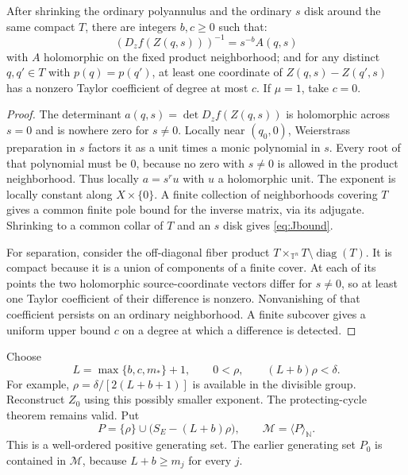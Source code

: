\documentclass[11pt,letterpaper]{article}
\theoremstyle{definition}
\theoremstyle{remark}
\newcommand{\N}{\mathbb N}\newcommand{\Z}{\mathbb Z}\newcommand{\Q}{\mathbb Q}
\newcommand{\T}{\mathbb T}\newcommand{\D}{\mathbb D}
\newcommand{\powers}[1]{\langle #1\rangle_{\N}}
\numberwithin{equation}{section}
\begin{document}
\begin{lemma}\label{lem:bounds}
After shrinking the ordinary polyannulus and the ordinary $s$ disk around the
same compact $T$, there are integers $b,c\geq0$ such that:
\begin{equation}\label{eq:Jbound}
 (D_zf(Z(q,s)))^{-1}=s^{-b}A(q,s)
\end{equation}
with $A$ holomorphic on the fixed product neighborhood; and for any distinct
$q,q'\in T$ with $p(q)=p(q')$, at least one coordinate of
$Z(q,s)-Z(q',s)$ has a nonzero Taylor coefficient of degree at most $c$.
If $\mu=1$, take $c=0$.
\end{lemma}
\begin{proof}
The determinant $a(q,s)=\det D_zf(Z(q,s))$ is holomorphic across $s=0$ and
is nowhere zero for $s\ne0$. Locally near $(q_0,0)$, Weierstrass preparation
in $s$ factors it as a unit times a monic polynomial in $s$. Every root of
that polynomial must be $0$, because no zero with $s\ne0$ is allowed in the
product neighborhood. Thus locally $a=s^r u$ with $u$ a holomorphic unit.
The exponent is locally constant along $X\times\{0\}$. A finite collection
of neighborhoods covering $T$ gives a common finite pole bound for the
inverse matrix, via its adjugate. Shrinking to a common collar of $T$ and an
$s$ disk gives \eqref{eq:Jbound}.

For separation, consider the off-diagonal fiber product
$T\times_{\T^n}T\setminus\operatorname{diag}(T)$. It is compact because
it is a union of components of a finite cover. At each of its points the
two holomorphic source-coordinate vectors differ for $s\ne0$, so at least
one Taylor coefficient of their difference is nonzero. Nonvanishing of that
coefficient persists on an ordinary neighborhood. A finite subcover gives a
uniform upper bound $c$ on a degree at which a difference is detected.
\end{proof}

Choose
\begin{equation}\label{eq:Lrho}
 L=\max\{b,c,m_*\}+1,\qquad
 0<\rho,\qquad (L+b)\rho<\delta.
\end{equation}
For example, $\rho=\delta/[2(L+b+1)]$ is available in the divisible group.
Reconstruct $Z_0$ using this possibly smaller exponent. The protecting-cycle
theorem remains valid. Put
\begin{equation}\label{eq:P}
 P=\{\rho\}\cup\bigl(S_E-(L+b)\rho\bigr),
 \qquad \mathcal M=\powers P.
\end{equation}
This is a well-ordered positive generating set. The earlier generating set
$P_0$ is contained in $\mathcal M$, because $L+b\geq m_j$ for every $j$.
\end{document}
